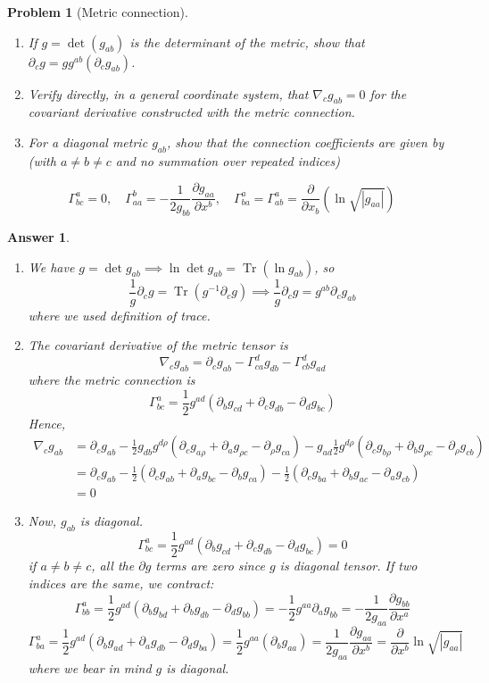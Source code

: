\documentclass[a4paper]{article}
\DeclareMathOperator{\Tr}{Tr}
\theoremstyle{new2}
\newtheorem{ans}{Answer}[section]
\theoremstyle{new}
\newtheorem{qns}{Problem}[section]
\begin{document}
\begin{qns}[Metric connection]\leavevmode
\begin{enumerate}[label=(\alph*)]
\item  If $g = \det(g_{ab})$ is the determinant of the metric, show that $\partial_cg = gg^{ab}(\partial_cg_{ab})$.
\item Verify directly, in a general coordinate system, that $\nabla_cg_{ab} = 0$ for the covariant derivative constructed with the metric connection.
\item For a diagonal metric $g_{ab}$, show
that the connection coefficients are given by (with $a\neq b\neq c$ and no summation over
repeated indices)
\end{enumerate}
$$\Gamma_{bc}^a=0,\quad\Gamma_{aa}^b=-\frac{1}{2g_{bb}}\frac{\partial g_{aa}}{\partial x^b},\quad\Gamma_{ba}^a=\Gamma_{ab}^a=\frac{\partial}{\partial x_b}(\ln\sqrt{|g_{aa}|})$$
\end{qns}
\begin{ans}\leavevmode
\begin{enumerate}[label=(\alph*)]
\item We have $g=\det g_{ab}\implies\ln \det g_{ab}=\Tr(\ln g_{ab})$, so
$$\frac{1}{g}\partial_cg=\Tr(g^{-1}\partial_cg)\implies\frac{1}{g}\partial_cg=g^{ab}\partial_cg_{ab}$$
where we used definition of trace.
\item The covariant derivative of the metric tensor is
$$\nabla_cg_{ab}=\partial_cg_{ab}-\Gamma_{ca}^dg_{db}-\Gamma_{cb}^dg_{ad}$$
where the metric connection is
$$\Gamma_{bc}^a=\frac{1}{2}g^{ad}(\partial_bg_{cd}+\partial_cg_{db}-\partial_dg_{bc})$$
Hence,
\begin{align}
    \nabla_cg_{ab}&=\partial_cg_{ab}-\frac{1}{2}g_{db}g^{d\rho}(\partial_cg_{a\rho}+\partial_ag_{\rho c}-\partial_\rho g_{ca})-g_{ad}\frac{1}{2}g^{d\rho}(\partial_cg_{b\rho}+\partial_bg_{\rho c}-\partial_\rho g_{cb})    \nonumber\\&=\partial_cg_{ab}-\frac{1}{2}(\partial_cg_{ab}+\partial_ag_{bc}-\partial_bg_{ca})-\frac{1}{2}(\partial_cg_{ba}+\partial_bg_{ac}-\partial_ag_{cb})\nonumber\\&=0\nonumber
\end{align}
\item Now, $g_{ab}$ is diagonal.
$$\Gamma_{bc}^a=\frac{1}{2}g^{ad}(\partial_bg_{cd}+\partial_cg_{db}-\partial_dg_{bc})=0$$
if $a\neq b\neq c$, all the $\partial g$ terms are zero since $g$ is diagonal tensor. If two indices are the same, we contract:
$$\Gamma_{bb}^a=\frac{1}{2}g^{ad}(\partial_bg_{bd}+\partial_bg_{db}-\partial_dg_{bb})=-\frac{1}{2}g^{aa}\partial_ag_{bb}=-\frac{1}{2g_{aa}}\frac{\partial g_{bb}}{\partial x^a}$$
$$\Gamma_{ba}^a=\frac{1}{2}g^{ad}(\partial_bg_{ad}+\partial_ag_{db}-\partial_dg_{ba})=\frac{1}{2}g^{aa}(\partial_bg_{aa})=\frac{1}{2g_{aa}}\frac{\partial g_{aa}}{\partial x^b}=\frac{\partial}{\partial x^b}\ln\sqrt{|g_{aa}|}$$
where we bear in mind $g$ is diagonal.
\end{enumerate}
\end{ans}
\end{document}
